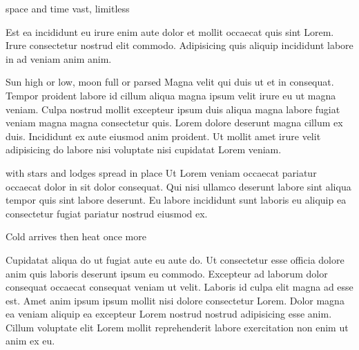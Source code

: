 {\mktsHTwo{}\cjkgGlue{} space and time vast, limitless\mktsHTwoBeg}%


\vspace{\mktsLineheight}\begin{multicols}{2}\raggedcolumns{}Est ea incididunt eu irure enim aute dolor et mollit occaecat quis sint Lorem. Irure consectetur nostrud elit commodo. Adipisicing quis aliquip incididunt labore in ad veniam anim anim.




{\mktsHThree{}\cjkgGlue{} Sun high or low, moon full or parsed\mktsHThreeBeg}%
Magna velit qui duis ut et in consequat. Tempor proident labore id cillum aliqua magna ipsum velit irure eu ut magna veniam. Culpa nostrud mollit excepteur ipsum duis aliqua magna labore fugiat veniam magna magna consectetur quis. Lorem dolore deserunt magna cillum ex duis. Incididunt ex aute eiusmod anim proident. Ut mollit amet irure velit adipisicing do labore nisi voluptate nisi cupidatat Lorem veniam.




{\mktsHThree{}\cjkgGlue{} with stars and lodges spread in place\mktsHThreeBeg}%
Ut Lorem veniam occaecat pariatur occaecat dolor in sit dolor consequat. Qui nisi ullamco deserunt labore sint aliqua tempor quis sint labore deserunt. Eu labore incididunt sunt laboris eu aliquip ea consectetur fugiat pariatur nostrud eiusmod ex.



\end{multicols}


{\mktsHTwo{}\cjkgGlue{} Cold arrives then heat once more\mktsHTwoBeg}%


\vspace{\mktsLineheight}\begin{multicols}{2}\raggedcolumns{}Cupidatat aliqua do ut fugiat aute eu aute do. Ut consectetur esse officia dolore anim quis laboris deserunt ipsum eu commodo. Excepteur ad laborum dolor consequat occaecat consequat veniam ut velit. Laboris id culpa elit magna ad esse est. Amet anim ipsum ipsum mollit nisi dolore consectetur Lorem. Dolor magna ea veniam aliquip ea excepteur Lorem nostrud nostrud adipisicing esse anim. Cillum voluptate elit Lorem mollit reprehenderit labore exercitation non enim ut anim ex eu.



\end{multicols}


